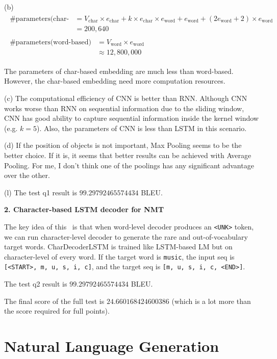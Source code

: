 (b) \begin{align}
		\begin{split}
			\text{\#parameters(char-based)} &= V_{\text{char}} \times e_{\text{char}} + k \times e_{\text{char}} \times e_{\text{word}} + e_{\text{word}} + (2 e_{\text{word}} + 2) \times e_{\text{word}} \\
			&= 200,640
		\end{split} \nonumber \\
		\begin{split}
			\text{\#parameters(word-based)} &= V_{\text{word}} \times e_{\text{word}} \\
			&\approx 12,800,000
		\end{split} \nonumber
	\end{align}
	
	The parameters of char-based embedding are much less than word-based. However, the char-based embedding need more computation resources.
	
(c) The computational efficiency of CNN is better than RNN. Although CNN works worse than RNN on sequential information due to the sliding window, CNN has good ability to capture sequential information inside the kernel window (e.g. $k=5$). Also, the parameters of CNN is less than LSTM in this scenario.

(d) If the position of objects is not important, Max Pooling seems to be the better choice. If it is, it seems that better results can be achieved with Average Pooling. For me, I don’t think one of the poolings has any significant advantage over the other.

(l) The test q1 result is $99.29792465574434$ BLEU.

\textbf{2. Character-based LSTM decoder for NMT}

The key idea of this~ is that when word-level decoder produces an \texttt{<UNK>} token, we can run character-level decoder to generate the rare and out-of-vocabulary target words.
CharDecoderLSTM is trained like LSTM-based LM but on character-level of every word.
If the target word is \texttt{music}, the input seq is \texttt{[<START>, m, u, s, i, c]}, and the target seq is \texttt{[m, u, s, i, c, <END>]}.

The test q2 result is $99.29792465574434$ BLEU.

The final score of the full test is $24.660168424600386$ (which is a lot more than the score required for full points).

\section{Natural Language Generation}

